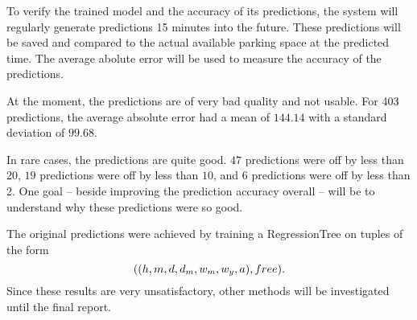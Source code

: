 To verify the trained model and the accuracy of its predictions, the system will regularly generate predictions 15 minutes into the future. These predictions will be saved and compared to the actual available parking space at the predicted time. The average abolute error will be used to measure the accuracy of the predictions.

At the moment, the predictions are of very bad quality and not usable. For 403 predictions, the average absolute error had a mean of \(144.14\) with a standard deviation of \(99.68\).

In rare cases, the predictions are quite good. \(47\) predictions were off by less than \(20\), 
\(19\) predictions were off by less than \(10\), and \(6\) predictions were off by less than 2. One goal -- beside improving the prediction accuracy overall -- will be to understand why these predictions were so good.

The original predictions were achieved by training a RegressionTree on tuples of the form 
\[
((h, m, d, d_m, w_m, w_y, a), free)\text{.}
\]
Since these results are very unsatisfactory, other methods will be investigated until the final report.